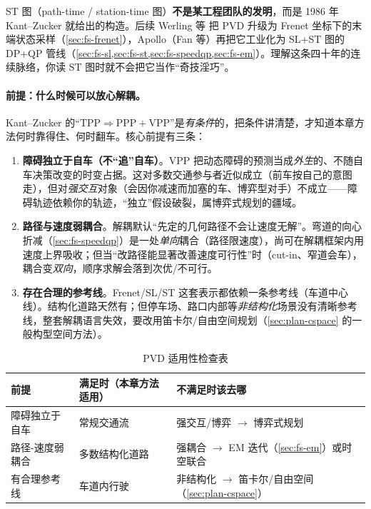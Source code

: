 \begin{insight}
ST 图（path-time / station-time 图）\textbf{不是某工程团队的发明}，而是 1986 年 Kant--Zucker 就给出的构造\cite{kant1986toward}。后续 Werling 等\cite{werling2010frenet} 把 PVD 升级为 Frenet 坐标下的末端状态采样（\cref{sec:fs-frenet}），Apollo（Fan 等\cite{fan2018baidu}）再把它工业化为 SL+ST 图的 DP+QP 管线（\cref{sec:fs-sl,sec:fs-st,sec:fs-speedqp,sec:fs-em}）。理解这条四十年的连续脉络，你读 ST 图时就不会把它当作“奇技淫巧”。
\end{insight}

\paragraph{前提：什么时候可以放心解耦。}
Kant--Zucker 的“$\text{TPP}\Rightarrow\text{PPP}+\text{VPP}$”是\emph{有条件}的，把条件讲清楚，才知道本章方法何时靠得住、何时翻车。核心前提有三条：
\begin{enumerate}
  \item \textbf{障碍独立于自车（不“追”自车）}。VPP 把动态障碍的预测当成\emph{外生}的、不随自车决策改变的时变占据。这对多数交通参与者近似成立（前车按自己的意图走），但对\emph{强交互}对象（会因你减速而加塞的车、博弈型对手）不成立——障碍轨迹依赖你的轨迹，“独立”假设破裂，属博弈式规划的疆域。
  \item \textbf{路径与速度弱耦合}。解耦默认“先定的几何路径不会让速度无解”。弯道的向心折减（\cref{sec:fs-speedqp}）是一处\emph{单向}耦合（路径限速度），尚可在解耦框架内用速度上界吸收；但当“改路径能显著改善速度可行性”时（cut-in、窄道会车），耦合变\emph{双向}，顺序求解会落到次优/不可行。
  \item \textbf{存在合理的参考线}。Frenet/SL/ST 这套表示都依赖一条参考线（车道中心线）。结构化道路天然有；但停车场、路口内部等\emph{非结构化}场景没有清晰参考线，整套解耦语言失效，要改用笛卡尔/自由空间规划（\cref{sec:plan-cspace} 的一般构型空间方法）。
\end{enumerate}

\begin{table}[H]\centering\small
\caption{PVD 适用性检查表}
\label{tab:fs-applicability}
\begin{tabular}{lll}
\toprule
前提 & 满足时（本章方法适用） & 不满足时该去哪 \\
\midrule
障碍独立于自车 & 常规交通流 & 强交互/博弈 $\to$ 博弈式规划 \\
路径-速度弱耦合 & 多数结构化道路 & 强耦合 $\to$ EM 迭代（\cref{sec:fs-em}）或时空联合 \\
有合理参考线 & 车道内行驶 & 非结构化 $\to$ 笛卡尔/自由空间（\cref{sec:plan-cspace}）\\
\bottomrule
\end{tabular}
\end{table}

